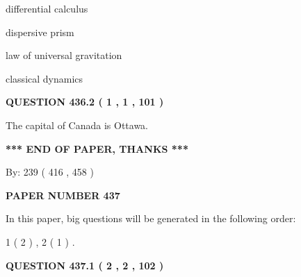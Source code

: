 \documentclass[12pt]{article}
\begin{document}
 
differential calculus
 
 
dispersive prism
 
 
law of universal gravitation
 
 
classical dynamics
 
 
 
 
  
\vspace{0.2in}
  
{\textbf{\Large{QUESTION
436.2 
 ( 1 , 1 , 101 )
}}}
  
  
 
 
\noindent{}
 
 
The capital of Canada is Ottawa.
 
 
 
 
   
   
\vspace{1.0in} 
{\textbf{\large{ *** END OF PAPER, THANKS *** }}} 
   
   
\hspace{1.0in} By: 
 239 ( 416 ,  458 )
   
   
   
   
\newpage 
\setcounter{page}{ 
   437001 } 
   
   
   
   
 {\textbf{ \Large{ PAPER NUMBER  437  }}}
   
   
\vspace{0.2in}
   
   
   
   
   
\vspace{0.2in}
   
In this paper, big questions will be generated in the following order: 
   
   
   1 ( 2 )
 ,
   2 ( 1 )
 .
  
\vspace{0.2in}
  
{\textbf{\Large{QUESTION
437.1 
 ( 2 , 2 , 102 )
}}}
  
  
 
 
\noindent{}
 
\end{document}
